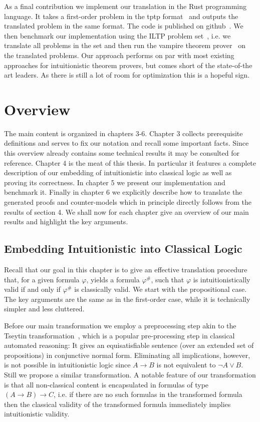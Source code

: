 \documentclass[a4paper,11pt]{report}
\theoremstyle{definition}
\theoremstyle{definition}
\theoremstyle{definition}
\theoremstyle{definition}
\theoremstyle{definition}
\theoremstyle{definition}
\theoremstyle{definition}
\begin{document}
	
	As a final contribution we implement our translation in the Rust programming language. It takes a first-order problem in the tptp format~\cite{tptp} and outputs the translated problem in the same format. The code is published on github~\cite{implementation}. We then benchmark our implementation using the ILTP problem set~\cite{iltp}, i.e. we translate all problems in the set and then run the vampire theorem prover~\cite{Kov_cs_2013} on the translated problems. Our approach performs on par with most existing approaches for intuitionistic theorem provers, but comes short of the state-of-the art leaders. As there is still a lot of room for optimization this is a hopeful sign.
	
	\chapter{Overview}

	The main content is organized in chapters 3-6. Chapter 3 collects prerequisite definitions and serves to fix our notation and recall some important facts. Since this overview already contains some technical results it may be consulted for reference. Chapter 4 is the meat of this thesis. In particular it features a complete description of our embedding of intuitionistic into classical logic as well as proving its correctness. In chapter 5 we present our implementation and benchmark it. Finally in chapter 6 we explicitly describe how to translate the generated proofs and counter-models which in principle directly follows from the results of section 4. 	We shall now for each chapter give an overview of our main results and highlight the key arguments. 

	\section{Embedding Intuitionistic into Classical Logic}

	Recall that our goal in this chapter is to give an effective translation procedure that, for a given formula $\varphi$, yields a formula $\varphi^\#$, such that $\varphi$ is intuitionistically valid if and only if $\varphi^\#$ is classically valid. We start with the propositional case. The key arguments are the same as in the first-order case, while it is technically simpler and less cluttered.
	
	Before our main transformation we employ a preprocessing step akin to the Tseytin transformation~\cite{tseitin1983complexity}, which is a popular pre-processing step in classical automated reasoning:
	It gives an equisatisfiable sentence (over an extended set of propositions) in conjunctive normal form.
	Eliminating all implications, however, is not possible in intuitionistic logic since $A\to B$ is not equivalent to $\neg A\vee B$.
	Still we propose a similar transformation.
	A notable feature of our transformation is that all non-classical content is encapsulated in formulas of type $(A\to B)\to C$, i.e. if there are no such formulas in the transformed formula then the classical validity of the transformed formula immediately implies intuitionistic validity.
	
\end{document}
